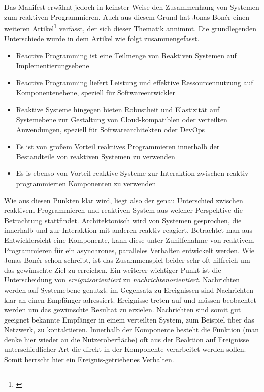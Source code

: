 Das Manifest erwähnt jedoch in keinster Weise den Zusammenhang von Systemen zum reaktiven Programmieren. Auch aus diesem Grund hat Jonas Bonér einen weiteren Artikel\footnote{\cite{Boner.2014}} verfasst, der sich dieser Thematik annimmt. Die grundlegenden Unterschiede wurde in dem Artikel wie folgt zusammengefasst.
\begin{itemize}
	\item Reactive Programming ist eine Teilmenge von Reaktiven Systemen auf Implementierungsebene
	\item Reactive Programming liefert Leistung und effektive Ressourcennutzung auf Komponentenebene, speziell für Softwareentwickler
	\item Reaktive Systeme hingegen bieten Robustheit und Elastizität auf Systemebene zur Gestaltung von Cloud-kompatiblen oder verteilten Anwendungen, speziell für Softwarearchitekten oder DevOps
	\item Es ist von großem Vorteil reaktives Programmieren innerhalb der Bestandteile von reaktiven Systemen zu verwenden
	\item Es is ebenso von Vorteil reaktive Systeme zur Interaktion zwischen reaktiv programmierten Komponenten zu verwenden
\end{itemize}
Wie aus diesen Punkten klar wird, liegt also der genau Unterschied zwischen reaktivem Programmieren und reaktiven System aus welcher Perspektive die Betrachtung stattfindet. Architektonisch wird von Systemen gesprochen, die innerhalb und zur Interaktion mit anderen reaktiv reagiert. Betrachtet man aus Entwicklersicht eine Komponente, kann diese unter Zuhilfenahme von reaktivem Programmieren für ein asynchrones, paralleles Verhalten entwickelt werden. Wie Jonas Bonér schon schreibt, ist das Zusammenspiel beider sehr oft hilfreich um das gewünschte Ziel zu erreichen. Ein weiterer wichtiger Punkt ist die Unterscheidung von \textit{ereignisorientiert} zu \textit{nachrichtenorientiert}. Nachrichten werden auf Systemebene genutzt. im Gegensatz zu Ereignissen sind Nachrichten klar an einen Empfänger adressiert. Ereignisse treten auf und müssen beobachtet werden um das gewünschte Resultat zu erzielen. Nachrichten sind somit gut geeignet bekannte Empfänger in einem verteilten System, zum Beispiel über das Netzwerk, zu kontaktieren. Innerhalb der Komponente besteht die Funktion (man denke hier wieder an die Nutzeroberfläche) oft aus der Reaktion auf Ereignisse unterschiedlicher Art die direkt in der Komponente verarbeitet werden sollen. Somit herrscht hier ein Ereignis-getriebenes Verhalten. 
